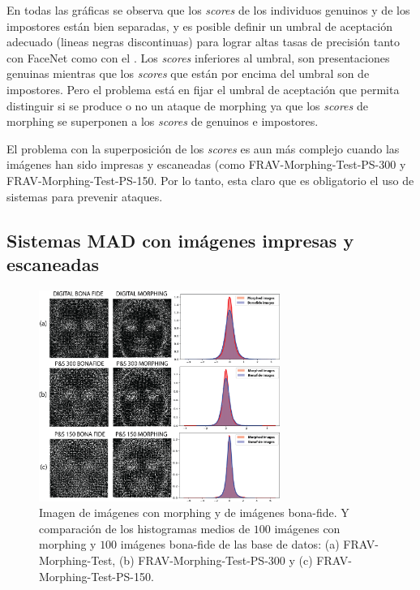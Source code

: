 En todas las gráficas se observa que los \textit{scores} de los individuos genuinos y de los impostores están bien separadas, y es posible definir un umbral de aceptación adecuado (lineas negras discontinuas) para lograr altas tasas de precisión tanto con \gls{FaceNet} como con el . Los \textit{scores} inferiores al umbral, son presentaciones genuinas mientras que los \textit{scores} que están por encima del umbral son de impostores. Pero el problema está en fijar el umbral de aceptación que permita distinguir si se produce o no un ataque de \gls{morphing} ya que los \textit{scores} de \gls{morphing} se superponen a los \textit{scores} de genuinos e impostores.

El problema con la superposición de los \textit{scores} es aun más complejo cuando las imágenes han sido impresas y escaneadas (como \Gls{FRAV-Morphing-Test-PS-300} y \Gls{FRAV-Morphing-Test-PS-150}. Por lo tanto, esta claro que es obligatorio el uso de sistemas  para prevenir ataques.


\subsection{Sistemas MAD con imágenes impresas y escaneadas} \label{ref:MADsystemUnderPrintScan} %

\begin{figure}[t!]
    \centering
    \includegraphics[width=0.7\textwidth]{ch-sistemasABC/images/ch-morphing/COMPARATIVA_PRNU_CON_BONAFIDE_MORPHING.png}
    \caption{Imagen  \cite{lukas2006digital} de imágenes con \gls{morphing} y de imágenes \gls{bona-fide}. Y comparación de los histogramas  medios de $100$ imágenes con \gls{morphing} y  $100$ imágenes \gls{bona-fide} de las base de datos: (a) \Gls{FRAV-Morphing-Test}, (b) \Gls{FRAV-Morphing-Test-PS-300} y (c) \Gls{FRAV-Morphing-Test-PS-150}.}
    \label{fig:PRNU_COMPARATIVE}
\end{figure}

